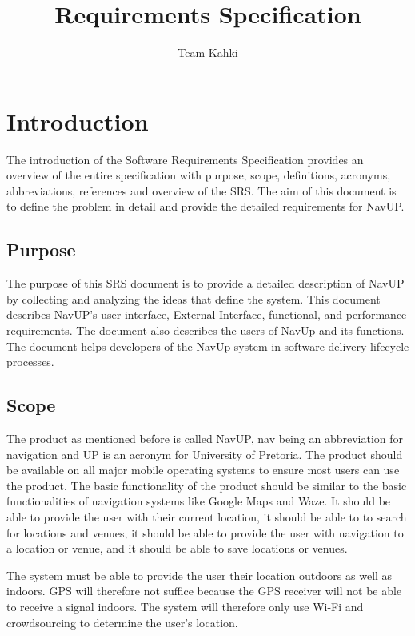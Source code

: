 \documentclass[11pt]{article}
\author{Team Kahki}
\title{Requirements Specification}
\begin{document}
	\setlength{\parskip}{6pt}
	
	
	
	\tableofcontents
	
	\newpage
		
	\section{Introduction}
	The introduction of the Software Requirements Specification provides an overview of the entire specification with purpose, scope, definitions, acronyms, abbreviations, references and overview of the SRS. The aim of this document is to define the problem in detail and provide the detailed requirements for NavUP.
	
	\subsection{Purpose}
	The purpose of this SRS document is to provide a detailed description of NavUP by collecting and analyzing the ideas that define the system. This document describes NavUP’s user interface, External Interface, functional, and performance requirements. The document also describes the users of NavUp and its functions. The document helps developers of the NavUp system in software delivery lifecycle processes. 

	\subsection{Scope}
	The product as mentioned before is called NavUP, nav being an abbreviation for navigation and UP is an acronym for University of Pretoria.
	The product should be available on all major mobile operating systems to ensure most users can use the product.
	The basic functionality of the product should be similar to the basic functionalities of navigation systems like Google Maps and Waze. It should be able to provide the user with their current location, it should be able to to search for locations and venues, it should be able to provide the user with navigation to a location or venue, and it should be able to save locations or venues. 
	
	The system must be able to provide the user their location outdoors as well as indoors. GPS will therefore not suffice because the GPS receiver will not be able to receive a signal indoors. The system will therefore only use Wi-Fi and crowdsourcing to determine the user's location.
	
\end{document}
